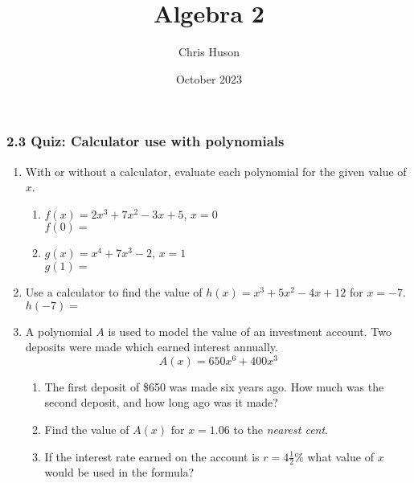 \documentclass[12pt, twoside]{article}
\title{Algebra 2}
\author{Chris Huson}
\date{October 2023}
\begin{document}
\subsubsection*{2.3 Quiz: Calculator use with polynomials}
\begin{enumerate}

\item With or without a calculator, evaluate each polynomial for the given value of $x$.
\begin{multicols}{2}
    \begin{enumerate}[itemsep=1cm]
        \item $f(x)=2x^3+7x^2-3x+5$, $x=0$ \\[0.25cm] 
        $f(0) = $ \vspace{2cm}
        \item $g(x)=x^4+7x^3-2$, $x=1$ \\[0.25cm] 
        $g(1) = $ \vspace{2cm}
    \end{enumerate}
    \end{multicols}

\item Use a calculator to find the value of $h(x)=x^3+5x^2-4x+12$ for $x=-7$. \\[0.25cm] 
$h(-7) = $ \vspace{2cm}

\item A polynomial $A$ is used to model the value of an investment account. Two deposits were made which earned interest annually.  $$A(x)=650x^6+400x^3$$ 
\begin{enumerate}[itemsep=1cm]
    \item The first deposit of \$650 was made six years ago. How much was the second deposit, and how long ago was it made? \vspace{2cm}
    \item Find the value of $A(x)$ for $x = 1.06$ to the \emph{nearest cent}. \vspace{2cm}
    \item If the interest rate earned on the account is $r = 4 \frac{1}{2}\%$ what value of $x$ would be used in the formula? \vspace{2cm}
\end{enumerate}

\end{enumerate}
\end{document}
